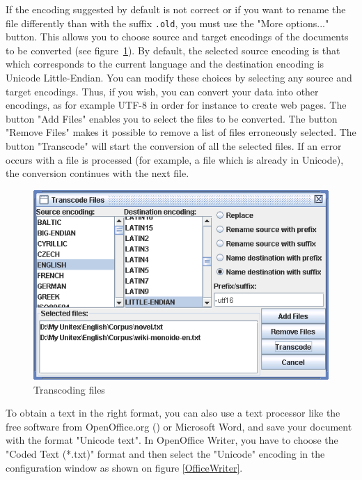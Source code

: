 \noindent If the encoding suggested by default is not correct  or if you want to
rename the file differently than with the suffix \verb$.old$, you must use the "More options..." 
button. This allows you to choose source and
target encodings of the documents to be converted (see figure~\ref{transcoding}). By default,
the selected source encoding is that which corresponds to the current language
and the destination encoding is Unicode Little-Endian. You can modify these choices by selecting
any source and target encodings. Thus, if you wish, you can convert your data
into other encodings, as for example UTF-8 in order for instance to create web pages. The button
"Add Files" enables you to select the files to be converted. The button "Remove Files" makes it
possible to remove a list of files erroneously selected. The button "Transcode" will start the
conversion of all the selected files. If an error occurs with a file is
processed (for example, a file which is already in Unicode), the 
conversion continues with the next file.


\begin{figure}[!ht]
\begin{center}
\includegraphics[width=12cm]{resources/img/fig2-3.png}
\caption{\label{transcoding}Transcoding files}
\end{center}
\end{figure}

\noindent To obtain a text in the right format, you can also use a text
processor like the free software from OpenOffice.org  (\cite{OpenOffice}) or Microsoft Word, and
save your document with the format "Unicode text".
In OpenOffice Writer, you have to choose the "Coded Text (*.txt)" format and then
select the "Unicode" encoding in the configuration window as shown on figure
\ref{OfficeWriter}.


